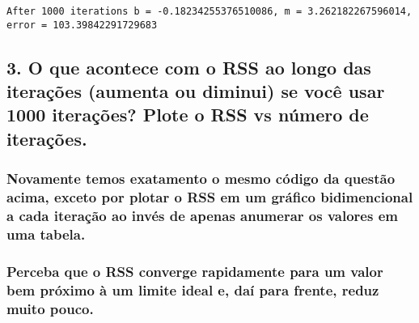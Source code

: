 \documentclass[11pt]{article}
\begin{document}
    
    
    \begin{Verbatim}[commandchars=\\\{\}]
After 1000 iterations b = -0.18234255376510086, m = 3.262182267596014, error = 103.39842291729683

    \end{Verbatim}

    \subsection{3. O que acontece com o RSS ao longo das iterações (aumenta
ou diminui) se você usar 1000 iterações? Plote o RSS vs número de
iterações.}\label{o-que-acontece-com-o-rss-ao-longo-das-iterauxe7uxf5es-aumenta-ou-diminui-se-vocuxea-usar-1000-iterauxe7uxf5es-plote-o-rss-vs-nuxfamero-de-iterauxe7uxf5es.}

\subsubsection{Novamente temos exatamento o mesmo código da questão
acima, exceto por plotar o RSS em um gráfico bidimencional a cada
iteração ao invés de apenas anumerar os valores em uma
tabela.}\label{novamente-temos-exatamento-o-mesmo-cuxf3digo-da-questuxe3o-acima-exceto-por-plotar-o-rss-em-um-gruxe1fico-bidimencional-a-cada-iterauxe7uxe3o-ao-invuxe9s-de-apenas-anumerar-os-valores-em-uma-tabela.}

\subsubsection{Perceba que o RSS converge rapidamente para um valor bem
próximo à um limite ideal e, daí para frente, reduz muito
pouco.}\label{perceba-que-o-rss-converge-rapidamente-para-um-valor-bem-pruxf3ximo-uxe0-um-limite-ideal-e-dauxed-para-frente-reduz-muito-pouco.}
\end{document}
